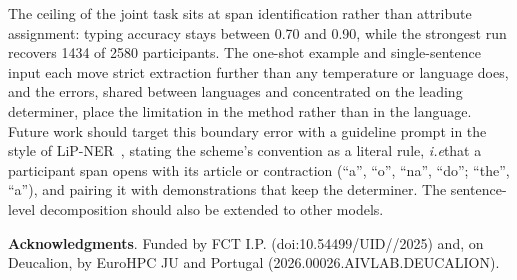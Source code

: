 \documentclass[extendedabs]{recpad2k}
\def\ie{\emph{i.e}\bmvaOneDot}
\begin{document}
The ceiling of the joint task sits at span identification rather than attribute assignment: typing accuracy stays between 0.70 and 0.90, while the strongest run recovers 1434 of 2580 participants. The one-shot example and single-sentence input each move strict extraction further than any temperature or language does, and the errors, shared between languages and concentrated on the leading determiner, place the limitation in the method rather than in the language. Future work should target this boundary error with a guideline prompt in the style of LiP-NER~\cite{lipner2025}, stating the scheme's convention as a literal rule, \ie that a participant span opens with its article or contraction (``a'', ``o'', ``na'', ``do''; ``the'', ``a''), and pairing it with demonstrations that keep the determiner. The sentence-level decomposition should also be extended to other models.

\textbf{Acknowledgments}. Funded by FCT I.P. (doi:10.54499/\allowbreak UID//2025) and, on Deucalion, by EuroHPC JU and Portugal (2026.00026.\allowbreak AIVLAB.\allowbreak DEUCALION).

{\scriptsize

}
\end{document}
